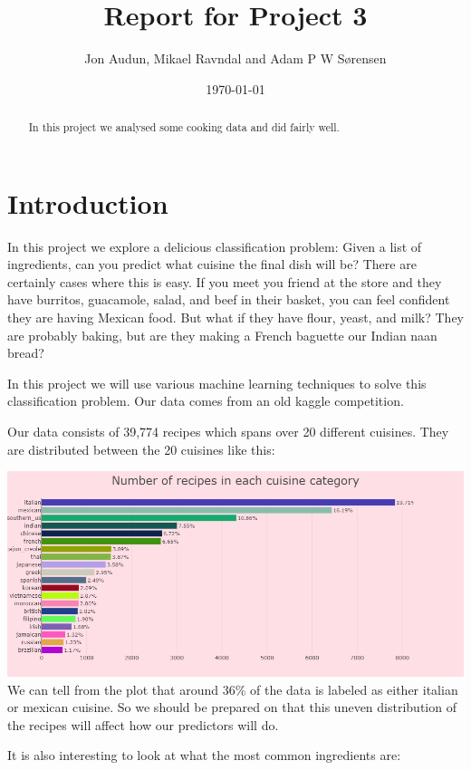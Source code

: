 \documentclass[parskip=half]{scrartcl}
\title{Report for Project 3}
\date{\today}
\author{Jon Audun, Mikael Ravndal and Adam P W S{\o}rensen}
\theoremstyle{definition}
\theoremstyle{remark}
\begin{document}

\maketitle

\begin{abstract}
In this project we analysed some cooking data and did fairly well. 
\end{abstract}


\section{Introduction}

In this project we explore a delicious classification problem: 
Given a list of ingredients, can you predict what cuisine the final dish will be?
There are certainly cases where this is easy. 
If you meet you friend at the store and they have burritos, guacamole, salad, and beef in their basket, you can feel confident they are having Mexican food. 
But what if they have flour, yeast, and milk? 
They are probably baking, but are they making a French baguette our Indian naan bread?   

In this project we will use various machine learning techniques to solve this classification problem.
Our data comes from an old kaggle competition. 

Our data consists of 39,774 recipes which spans over 20 different cuisines. They are distributed between the 20 cuisines like this:

\includegraphics[scale=.42]{images/cuisine_number}
We can tell from the plot that around 36\% of the data is labeled as either italian or mexican cuisine. So we should be prepared on that this uneven distribution of the recipes will affect how our predictors will do.

It is also interesting to look at what the most common ingredients are:
\end{document}
